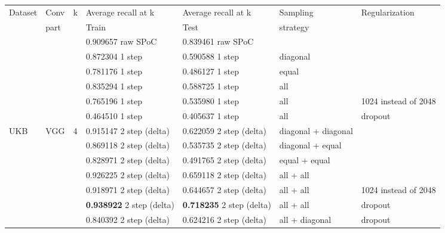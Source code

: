 \documentclass[10pt,a4paper]{article}
\begin{document}
    \begin{table}[h!]
        \begin{tabular}{|l|l|l|l|l|l|l|}
            \hline
            Dataset & Conv & k & Average recall at k & Average recall at k & Sampling & Regularization       \\
            & part & & Train & Test & strategy &                      \\ \hline
            & & & 0.909657 raw SPoC & 0.839461 raw SPoC & &                      \\ \cline{4-7}

            & & & 0.872304 1 step & 0.590588 1 step & diagonal &                      \\
            & & & 0.781176 1 step & 0.486127 1 step & equal &                      \\
            & & & 0.835294 1 step & 0.588725 1 step & all &                      \\
            & & & 0.765196 1 step & 0.535980 1 step & all & 1024 instead of 2048 \\
            & & & 0.464510 1 step & 0.405637 1 step & all & dropout              \\ \cline{4-7}

            UKB & VGG & 4 & 0.915147 2 step (delta)     & 0.622059 2 step (delta)     & diagonal + diagonal &                      \\
            & & & 0.869118 2 step (delta)     & 0.535735 2 step (delta)     & diagonal + equal &                      \\
            & & & 0.828971 2 step (delta)     & 0.491765 2 step (delta)     & equal + equal &                      \\
            & & & 0.926225 2 step (delta)     & 0.659118 2 step (delta)     & all + all &                      \\
            & & & 0.918971 2 step (delta)     & 0.644657 2 step (delta)     & all + all & 1024 instead of 2048 \\
            & & & \textbf{0.938922} 2 step (delta) & \textbf{0.718235} 2 step (delta) & all + all & dropout              \\
            & & & 0.840392 2 step (delta)     & 0.624216 2 step (delta)     & all + diagonal & dropout              \\ \cline{4-7}


\end{tabular}
\end{table}
\end{document}
